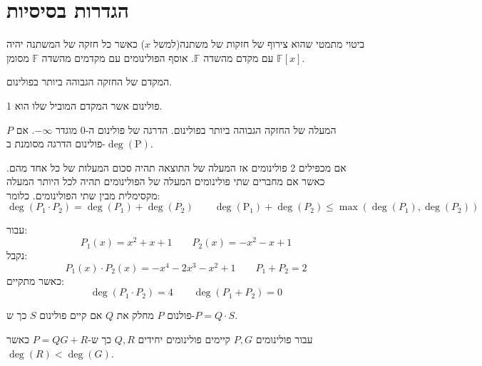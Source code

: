 \documentclass{tstextbook}
\begin{document}
\section{הגדרות בסיסיות}

\begin{definition}[פולינום]
ביטוי מתמטי שהוא צירוף של חזקות של משתנה(למשל \(x\)) כאשר כל חזקה של המשתנה יהיה עם מקדם מהשדה \(\mathbb{F}\). אוסף הפולינומים עם מקדמים מהשדה \(\mathbb{F}\) מסומן \(\mathbb{F} [x]\).

\end{definition}
\begin{definition}
המקדם של החזקה הגבוהה ביותר בפולינום.

\end{definition}
\begin{definition}
פולינום אשר המקדם המוביל שלו הוא 1. 

\end{definition}
\begin{definition}
המעלה של החזקה הגבוהה ביותר בפולינום. הדרגה של פולינום ה-0 מוגדר \(-\infty\). אם \(P\) פולינום הדרגה מסומנת ב-\(\mathrm{\deg(P)}\).

\end{definition}
\begin{proposition}
אם מכפילים 2 פולינומים אז המעלה של התוצאה תהיה סכום המעלות של כל אחד מהם. כאשר אם מחברים שתי פולינומים המעלה של הפולינומים תהיה לכל היותר המעלה מקסימלית מבין שתי הפולינומים. כלומר:
$$\deg\left( P_{1}\cdot P_{2} \right)=\deg(P_{1}) +\deg(P_{2}) \qquad \mathrm{\deg(P_{1}) }+\deg(P_{2}) \leq \max \left( \deg(P_{1}) ,\deg(P_{2})  \right)  $$

\end{proposition}
\begin{example}
עבור:
$$P_{1}(x)=x^{2}+x+1\qquad P_{2}(x)=-x^2-x+1$$
נקבל:
$$P_{1}(x)\cdot P_{2}(x)=- x^{4} - 2 x^{3} - x^{2} + 1 \qquad P_{1}+P_{2}=2$$
כאשר מתקיים:
$${\deg\left( P_{1}\cdot P_{2} \right) }=4\qquad \deg(P_{1}+P_{2})=0 $$

\end{example}
\begin{definition}[חלוקה]
פולנום \(P\) מחלק את \(Q\) אם קיים פולינום \(S\) כך ש-\(P=Q\cdot S\). 

\end{definition}
\begin{theorem}[השארית]
עבור פולינומים \(P,G\) קיימים פולינומים יחידים \(Q,R\) כך ש-\(P=QG+R\) כאשר \(\deg(R)<\deg(G)\).

\end{theorem}
\end{document}
